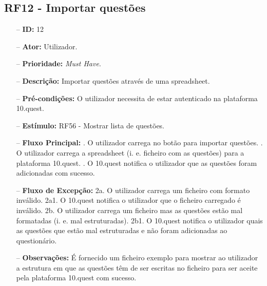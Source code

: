 \subsection{RF12 - Importar questões}
\begin{itemize}
	\item[--] \textbf{ID:} 12
	\item[--]  \textbf{Ator:} Utilizador.
	\item[--]  \textbf{Prioridade:} \textit{Must Have}.
	\item[--]  \textbf{Descrição:} Importar questões através de uma spreadsheet. 
	\item[--]  \textbf{Pré-condições:} O utilizador necessita de estar autenticado na plataforma 10.quest.
	\item[--]  \textbf{Estímulo:}  
		\subitem RF56 - Mostrar lista de questões.
	\item[--]  \textbf{Fluxo Principal:} 
		. O utilizador carrega no botão para importar questões.
		. O utilizador carrega a spreadsheet (i. e. ficheiro com as questões) para a plataforma 10.quest.
		. O 10.quest notifica o utilizador que as questões foram adicionadas com sucesso.
	\item[--]  \textbf{Fluxo de Excepção:} 
		\subitem 2a. O utilizador carrega um ficheiro com formato inválido.
		\subitem 2a1. O 10.quest notifica o utilizador que o ficheiro carregado é inválido.
		\subitem 2b. O utilizador carrega um ficheiro mas as questões estão mal formatadas (i. e. mal estruturadas).
		\subitem 2b1. O 10.quest notifica o utilizador quais as questões que estão mal estruturadas e não foram adicionadas ao questionário.
	\item[--]  \textbf{Observações:} É fornecido um ficheiro exemplo para mostrar ao utilizador a estrutura em que as questões têm de ser escritas no ficheiro para ser aceite pela plataforma 10.quest com sucesso.
\end{itemize}
\newpage

